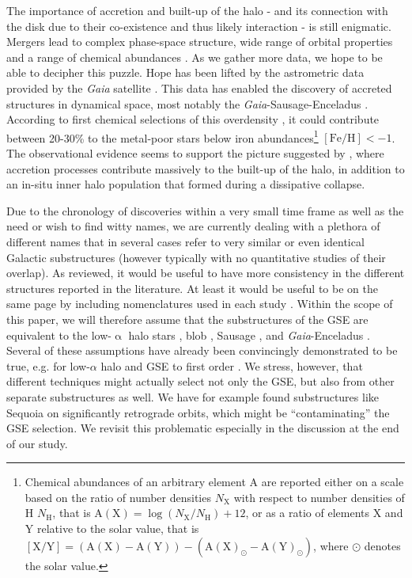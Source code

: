 \documentclass[fleqn,usenatbib]{mnras}
\newcommand{\Gaia}{\textit{Gaia}\xspace} %
\begin{document}
The importance of accretion and built-up of the halo - and its connection with the disk due to their co-existence and thus likely interaction - is still enigmatic. Mergers lead to complex phase-space structure, wide range of orbital properties and a range of chemical abundances \citep{Koppelman2020b}. As we gather more data, we hope to be able to decipher this puzzle. Hope has been lifted by the astrometric data provided by the \Gaia satellite \citep{Brown2016}. This data has enabled the discovery of accreted structures in dynamical space, most notably the \Gaia-Sausage-Enceladus \citep[GSE, see e.g.][]{Belokurov2018, Helmi2018, Helmi2020}. According to first chemical selections of this overdensity \citep{Das2020}, it could contribute between 20-30\% to the metal-poor stars below iron abundances\footnote{Chemical abundances of an arbitrary element A are reported either on a scale based on the ratio of number densities $N_\mathrm{X}$ with respect to number densities of H $N_\mathrm{H}$, that is $\mathrm{A(X)} = \log \left(N_\mathrm{X}/N_\mathrm{H} \right) + 12$, or as a ratio of elements X and Y relative to the solar value, that is $\mathrm{[X/Y]} = \left( \mathrm{A(X)} -\mathrm{ A(Y)} \right) - \left( \mathrm{A(X)}_\odot -\mathrm{A(Y)}_\odot \right) $, where $\odot$ denotes the solar value.} $\mathrm{[Fe/H]} < -1$. The observational evidence \citep[for reviews see][]{Nissen2018, Helmi2020} seems to support the picture suggested by \citet{Searle1978}, where accretion processes contribute massively to the built-up of the halo, in addition to an in-situ inner halo population that formed during a dissipative collapse.

Due to the chronology of discoveries within a very small time frame as well as the need or wish to find witty names, we are currently dealing with a plethora of different names that in several cases refer to very similar or even identical Galactic substructures (however typically with no quantitative studies of their overlap). As \citet{Helmi2020} reviewed, it would be useful to have more consistency in the different structures reported in the literature. At least it would be useful to be on the same page by including nomenclatures used in each study \citep[see.e.g][]{An2021b}. Within the scope of this paper, we will therefore assume that the substructures of the GSE are equivalent to the low-$\upalpha$ halo stars \citep{Nissen2010}, blob \citep{Koppelman2018, Das2020}, Sausage \citep{Belokurov2018}, and \Gaia-Enceladus \citep{Helmi2018}. Several of these assumptions have already been convincingly demonstrated to be true, e.g. for low-$\alpha$ halo and GSE to first order \citep{Haywood2018}. We stress, however, that different techniques might actually select not only the GSE, but also from other separate substructures as well.  We have for example found substructures like Sequoia \citep{Myeong2019} on significantly retrograde orbits, which might be ``contaminating'' the GSE selection. We revisit this problematic especially in the discussion at the end of our study.
\end{document}
